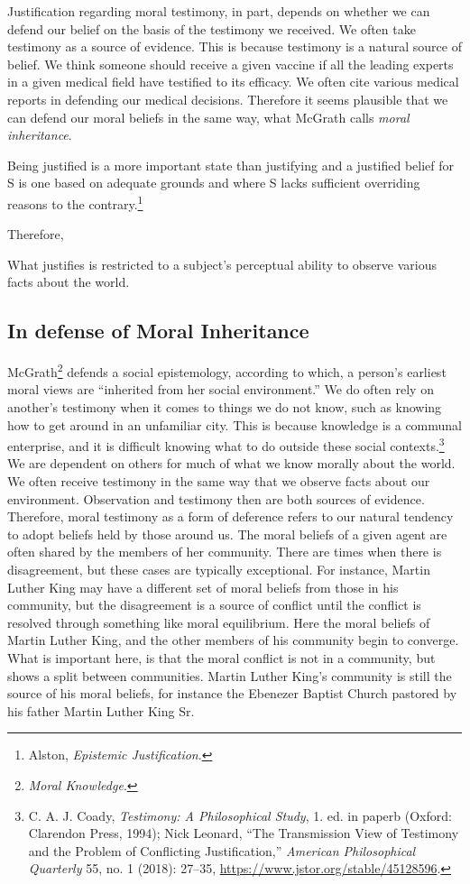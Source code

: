\documentclass[phdthesis,12pt,final,a4paper]{wuthesis}
\theoremstyle{definition}
\theoremstyle{definition}
\theoremstyle{definition}
\theoremstyle{definition}
\theoremstyle{remark}
\begin{document}
Justification regarding moral testimony, in part, depends on whether we can defend our belief on the basis of the testimony we received. We often take testimony as a source of evidence. This is because testimony is a natural source of belief. We think someone should receive a given vaccine if all the leading experts in a given medical field have testified to its efficacy. We often cite various medical reports in defending our medical decisions. Therefore it seems plausible that we can defend our moral beliefs in the same way, what McGrath calls \emph{moral inheritance}.

Being justified is a more important state than justifying and a justified belief for S is one based on adequate grounds and where S lacks sufficient overriding reasons to the contrary.\footnote{Alston, \emph{Epistemic Justification}.}

Therefore,

What justifies is restricted to a subject's perceptual ability to observe various facts about the world.

\subsection*{In defense of Moral Inheritance}\label{in-defense-of-moral-inheritance}

McGrath\footnote{\emph{Moral {Knowledge}}.} defends a social epistemology, according to which, a person's earliest moral views are ``inherited from her social environment.'' We do often rely on another's testimony when it comes to things we do not know, such as knowing how to get around in an unfamiliar city. This is because knowledge is a communal enterprise, and it is difficult knowing what to do outside these social contexts.\footnote{C. A. J. Coady, \emph{Testimony: A Philosophical Study}, 1. ed. in paperb (Oxford: Clarendon Press, 1994); Nick Leonard, {``The {Transmission View} of {Testimony} and the {Problem} of {Conflicting Justification},''} \emph{American Philosophical Quarterly} 55, no. 1 (2018): 27--35, \url{https://www.jstor.org/stable/45128596}.} We are dependent on others for much of what we know morally about the world. We often receive testimony in the same way that we observe facts about our environment. Observation and testimony then are both sources of evidence. Therefore, moral testimony as a form of deference refers to our natural tendency to adopt beliefs held by those around us. The moral beliefs of a given agent are often shared by the members of her community. There are times when there is disagreement, but these cases are typically exceptional. For instance, Martin Luther King may have a different set of moral beliefs from those in his community, but the disagreement is a source of conflict until the conflict is resolved through something like moral equilibrium. Here the moral beliefs of Martin Luther King, and the other members of his community begin to converge. What is important here, is that the moral conflict is not in a community, but shows a split between communities. Martin Luther King's community is still the source of his moral beliefs, for instance the Ebenezer Baptist Church pastored by his father Martin Luther King Sr.
\end{document}
